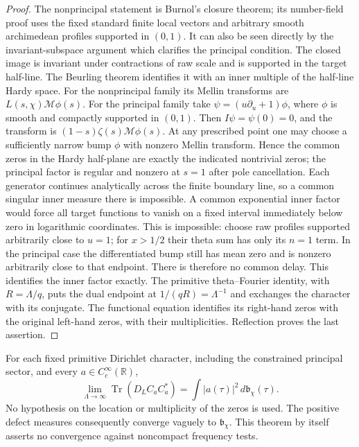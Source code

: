 \begin{proof}
The nonprincipal statement is Burnol's closure theorem; its
number-field proof uses the fixed standard finite local vectors and
arbitrary smooth archimedean profiles supported in $(0,1)$.
It can also be seen directly by the invariant-subspace argument
which clarifies the principal condition.
The closed image is invariant under contractions of raw scale and
is supported in the target half-line.  The Beurling theorem identifies
it with an inner multiple of the half-line Hardy space.
For the nonprincipal family its Mellin transforms are
$L(s,\chi)\mathcal M\phi(s)$.
For the principal family take
$\psi=(u\partial_u+1)\phi$, where $\phi$ is smooth and compactly
supported in $(0,1)$.  Then $I\psi=\psi(0)=0$, and the transform is
$(1-s)\zeta(s)\mathcal M\phi(s)$.
At any prescribed point one may choose a sufficiently narrow bump
$\phi$ with nonzero Mellin transform.  Hence the common zeros in
the Hardy half-plane are exactly the indicated nontrivial zeros;
the principal factor is regular and nonzero at $s=1$ after pole
cancellation.  Each generator continues analytically across the
finite boundary line, so a common singular inner measure there is
impossible.  A common exponential inner factor would force all
target functions to vanish on a fixed interval immediately below
zero in logarithmic coordinates.  This is impossible: choose raw
profiles supported arbitrarily close to $u=1$; for $x>1/2$ their
theta sum has only its $n=1$ term.  In the principal case the
differentiated bump still has mean zero and is nonzero arbitrarily
close to that endpoint.  There is therefore no common delay.
This identifies the inner factor exactly.
The primitive theta--Fourier identity, with $R=\Lambda/q$, puts the
dual endpoint at $1/(qR)=\Lambda^{-1}$ and exchanges the character
with its conjugate.  The functional equation identifies its
right-hand zeros with the original left-hand zeros, with their
multiplicities.  Reflection proves the last assertion.
\end{proof}

\begin{theorem}\label{thm:rational-local-limit}
For each fixed
primitive Dirichlet character, including the constrained principal
sector, and every $a\in C_c^\infty(\mathbb R)$,
\[
 \lim_{\Lambda\to\infty}\operatorname{Tr}(D_LC_aC_a^*)
                   =\int |a(\tau)|^2\,d\mathfrak b_\chi(\tau).
\]
No hypothesis on the location or multiplicity of the zeros is used.
The positive defect measures consequently converge vaguely to
$\mathfrak b_\chi$.  This theorem by itself asserts no convergence
against noncompact frequency tests.
\end{theorem}

